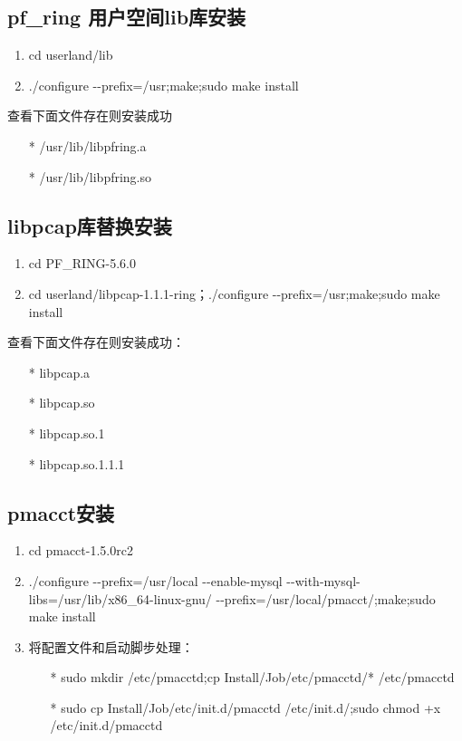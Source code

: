 \documentclass[10pt]{article}
\begin{document}
\subsection{pf\_ring 用户空间lib库安装}
\begin{enumerate}
    \item cd userland/lib
    \item ./configure -{}-prefix=/usr;make;sudo make install
    \end{enumerate}
	查看下面文件存在则安装成功
    \begin{itemize}
        \item[*] /usr/lib/libpfring.a 
        \item[*] /usr/lib/libpfring.so
    \end{itemize}
\bigskip
\subsection{libpcap库替换安装}
\begin{enumerate}
    \item cd PF\_RING-5.6.0
    \item cd userland/libpcap-1.1.1-ring；./configure -{}-prefix=/usr;make;sudo make install
\end{enumerate}
	查看下面文件存在则安装成功：
    \begin{itemize}
        \item[*] libpcap.a 
        \item[*] libpcap.so 
		\item[*] libpcap.so.1 
		\item[*] libpcap.so.1.1.1 
    \end{itemize}
\bigskip
\subsection{pmacct安装}
\begin{enumerate}
    \item cd pmacct-1.5.0rc2
    \item  ./configure -{}-prefix=/usr/local -{}-enable-mysql -{}-with-mysql-libs=/usr/lib/x86\_64-linux-gnu/ -{}-prefix=/usr/local/pmacct/;make;sudo make install
	\item 将配置文件和启动脚步处理：
        \begin{itemize}
            \item[*] sudo mkdir /etc/pmacctd;cp Install/Job/etc/pmacctd/* /etc/pmacctd
            \item[*] sudo cp Install/Job/etc/init.d/pmacctd /etc/init.d/;sudo chmod +x /etc/init.d/pmacctd
        \end{itemize}
\end{enumerate}
\end{document}
